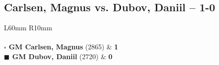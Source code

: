 \documentclass[../main.tex]{subfiles}
\begin{document}
\subsection{Carlsen,  Magnus vs. Dubov,  Daniil -- 1-0}

\begin{multicols*}{2}

\begin{tabular}{L{60mm} R{10mm}}
\\ 
\\[3mm]
\textbf{$\square$ \hspace{2mm}  GM Carlsen,  Magnus} (2865)  & \textbf{1}\\ 
\textbf{$\blacksquare$ \hspace{2mm}  GM Dubov,  Daniil} (2720)  & \textbf{0}\\ 
\end{tabular}

\end{multicols*}
\pagebreak
\end{document}
